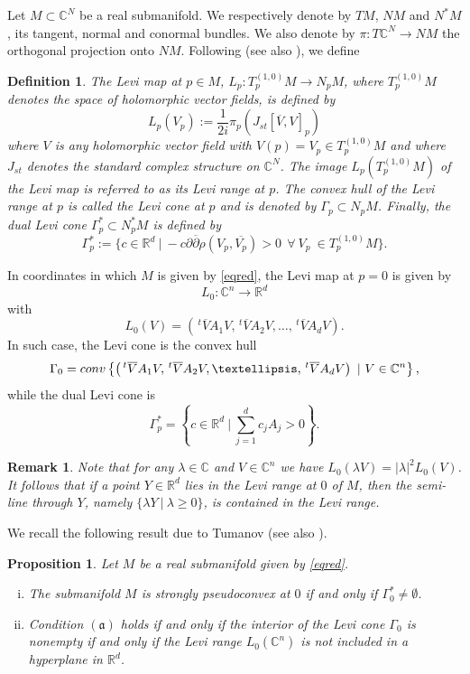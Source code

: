 \documentclass[10pt,a4paper]{amsart}
\newcommand{\C}{\mathbb C}
\newcommand{\R}{\mathbb R}
\newcommand{\transp}{\,^t}
\newcommand{\aaa}{\mathfrak{(a)}}
\newtheorem{prop}[theo]{Proposition}
\newtheorem{remark}[theo]{Remark}
\newtheorem{defi}[theo]{Definition}
\numberwithin{equation}{section}
\begin{document}
Let $M \subset \C^{N}$ be a real submanifold. We respectively denote by $TM$, $NM$ and $N^*M$, its tangent, normal and conormal bundles. We also denote by $\pi: T{\C^N} \to NM$ the orthogonal projection onto $NM$. Following \cite{ber, bo} (see also \cite{bl-me}), we define 
\begin{defi}
The {\it Levi map} at $p \in M$, $L_p: T_p^{(1,0)}M \to N_pM$, where $T_p^{(1,0)}M$ denotes the space of holomorphic vector fields, is defined by 
$$L_p(V_p):=\frac{1}{2i}\pi_p\left(J_{st}\left[\overline{V},V\right]_p\right)$$
where $V$ is any holomorphic vector field with $V(p)=V_p \in T_p^{(1,0)}M$ and where $J_{st}$ denotes the standard complex structure on $\C^N$.  
The image $L_p\left(T_p^{(1,0)}M\right)$ of the Levi map is referred to as its {\it Levi range at $p$}. The convex  hull of the Levi range at $p$ is called the {\it Levi cone at $p$} and is denoted by $\Gamma_p\subset N_pM$. Finally, the {\it dual Levi cone} $\Gamma^*_p\subset N^*_pM$ is defined by 
$$\Gamma^*_p:=\{ c \in\R^d \ | \ -c\partial \overline{\partial}\rho\left(V_p,\overline{V_p}\right)>0 \  \ \forall \ V_p \ \in T_p^{(1,0)}M\}.$$
\end{defi}
In coordinates in which $M$ is given by \eqref{eqred}, the Levi map at $p=0$ is given by $$L_0: \C^n \to \R^d$$ with
$$L_0(V)=\left(\transp \overline{V}A_1V,\transp \overline{V}A_2V,\ldots,\transp \overline{V}A_dV\right).$$
In such case, the Levi cone is the convex hull 
$$\Gamma_0={\rm conv} \left\{\left(\transp \overline{V}A_1V,\transp \overline{V}A_2V,\ldots,\transp \overline{V}A_dV\right) \ | \ V\in \C^n \right\},$$
while the  dual Levi cone is 
$$\Gamma^*_p=\left\{ c \in\R^d \ | \ \sum_{j=1}^dc_jA_j>0 \right\}.$$  
\begin{remark}
Note that for any $\lambda \in \C$ and $V \in \C^n$ we have $L_0(\lambda V)=|\lambda|^2L_0(V)$. It follows that if a point $Y \in \R^d$ lies in the Levi range at $0$ of $M$, then the semi-line through $Y$, namely $\{ \lambda Y \ | \ \lambda \geq 0\}$,  is contained in the Levi range.
\end{remark}     
We recall the following result due to Tumanov \cite{tu} (see also \cite{bl-me}).



\begin{prop}\label{propcone1}
Let $M$ be a real submanifold given by \eqref{eqred}. 
\begin{enumerate}[i.]
\item The submanifold $M$ is strongly pseudoconvex at $0$ if and only if $\Gamma^*_0\neq \emptyset$.
\item Condition $\aaa$ holds if and only if the interior of the Levi cone $\Gamma_0$ is  nonempty if and only if the Levi range $L_0(\C^n)$ is not included in a hyperplane in $\R^d$. 
\end{enumerate}
\end{prop}
\end{document}

